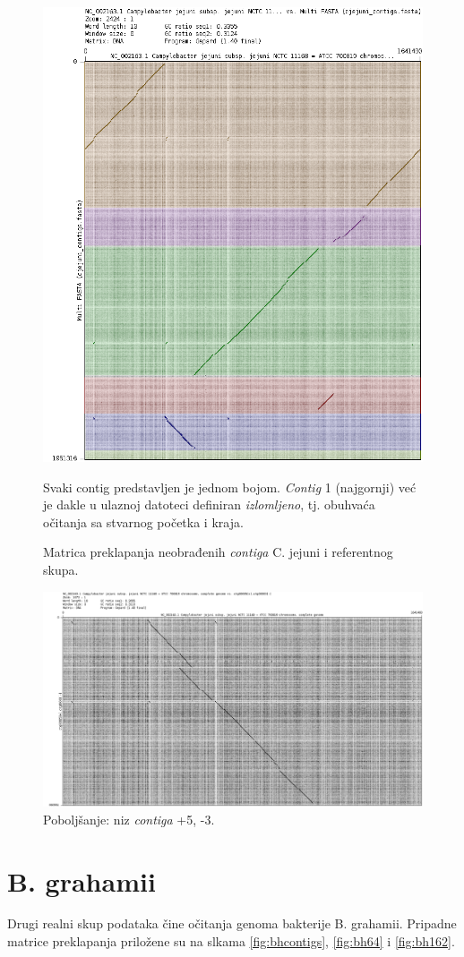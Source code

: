 \documentclass[times, utf8, seminar, numeric]{fer}
\begin{document}
\begin{figure}[h]
	\centering
	\centerline{\includegraphics[width=0.7\linewidth]{img/cj_contigs}}
	\caption{Matrica preklapanja neobrađenih \textit{contiga} C. jejuni i referentnog skupa.}
	\label{fig:cjcontigs}
	\small
	Svaki contig predstavljen je jednom bojom. \textit{Contig} 1 (najgornji) već je dakle u ulaznoj datoteci definiran \textit{izlomljeno}, tj. obuhvaća očitanja sa stvarnog početka i kraja.
\end{figure}

\begin{figure}[h]
	\centering
	\centerline{\includegraphics[width=0.7\linewidth]{img/cj_5_3}}
	\caption{Poboljšanje: niz \textit{contiga} +5, -3.}
	\label{fig:cj53}
\end{figure}


\section{B. grahamii}
Drugi realni skup podataka čine očitanja genoma bakterije B. grahamii. Pripadne matrice preklapanja priložene su na slkama \ref{fig:bhcontigs}, \ref{fig:bh64} i \ref{fig:bh162}.
\end{document}
